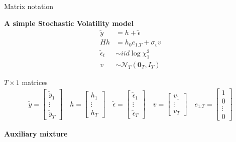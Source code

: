 \documentclass[notes,blackandwhite,mathsans,usenames,dvipsnames]{beamer}
\begin{document}
\begin{frame}{Matrix notation}

\textbf{A simple Stochastic Volatility model}
\begin{align*}
\tilde{y} &= h + \tilde{\epsilon} \\[1ex]
Hh &= h_0 e_{1.T} + \sigma_v v \\[1ex]
\tilde{\epsilon}_t &\sim iid\log\chi^2_1\\[1ex]
v &\sim\mathcal{N}_T\left( \mathbf{0}_T, I_T \right)
\end{align*}

 $T\times1$ {\color{mcxs2}matrices}
\begin{align*}
\tilde{y} = \begin{bmatrix} \tilde{y}_1\\ \vdots\\ \tilde{y}_T \end{bmatrix}\quad
h = \begin{bmatrix} h_1\\ \vdots\\ h_T \end{bmatrix}\quad
\tilde{\epsilon} = \begin{bmatrix} \tilde{\epsilon}_1\\ \vdots\\ \tilde{\epsilon}_T \end{bmatrix}\quad
v = \begin{bmatrix} v_1\\ \vdots\\ v_T \end{bmatrix}\quad
e_{1.T}=\begin{bmatrix} 1\\ 0\\ \vdots\\ 0  \end{bmatrix}
\end{align*}

\end{frame}







{
\begin{frame}

\begin{adjustwidth}{-0.5cm}{0cm}
\FlushLeft
\vspace{8.3cm}\Large
\textbf{{\color{mcxs2}Auxiliary} {\color{mcxs3}mixture}}
\end{adjustwidth}

\end{frame}
}
\end{document}
